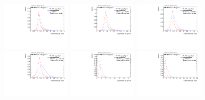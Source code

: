 \begin{figure}
\bigskip
\includegraphics[width=0.3\textwidth]{sascha_input/Appendix/Distributions/w/distributions/beta05/h_recoJet_D2_05_bin1.pdf} \hspace{1mm}
\includegraphics[width=0.3\textwidth]{sascha_input/Appendix/Distributions/w/distributions/beta05/h_recoJet_D2_05_bin2.pdf} \hspace{1mm}
\includegraphics[width=0.3\textwidth]{sascha_input/Appendix/Distributions/w/distributions/beta05/h_recoJet_D2_05_bin3.pdf} 
\bigskip
\includegraphics[width=0.3\textwidth]{sascha_input/Appendix/Distributions/w/distributions/beta05/h_recoJet_D2_05_bin4.pdf} \hspace{1mm}
\includegraphics[width=0.3\textwidth]{sascha_input/Appendix/Distributions/w/distributions/beta05/h_recoJet_D2_05_bin5.pdf} \hspace{1mm}
\includegraphics[width=0.3\textwidth]{sascha_input/Appendix/Distributions/w/distributions/beta05/h_recoJet_D2_05_bin6.pdf}

\end{figure}
